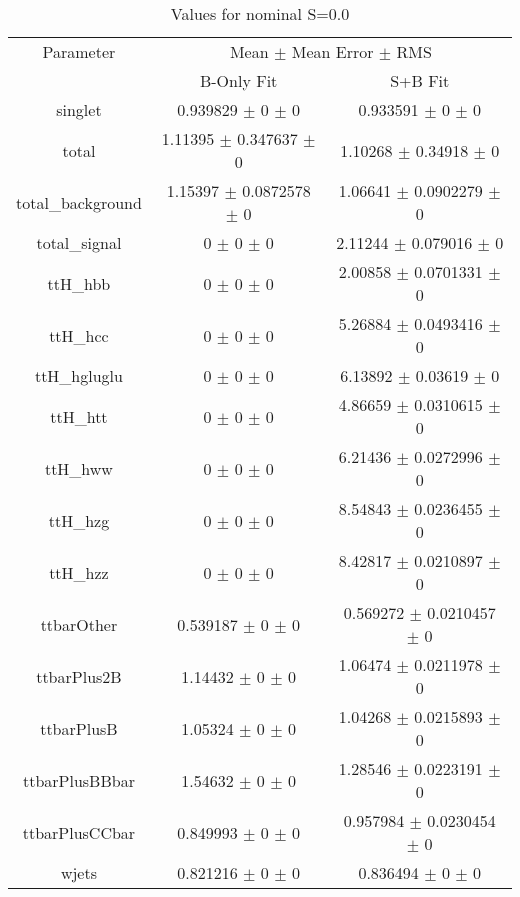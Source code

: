 \begin{table}
\centering
\caption{Values for nominal S=0.0}
\begin{tabular}{ccc}
\toprule
Parameter & \multicolumn{2}{c}{Mean $\pm$ Mean Error $\pm$ RMS}\\
 & B-Only Fit & S+B Fit\\
\midrule
singlet & \num{0.939829} $\pm$ \num{0} $\pm$ \num{0} & \num{0.933591} $\pm$ \num{0} $\pm$ \num{0}\\
total & \num{1.11395} $\pm$ \num{0.347637} $\pm$ \num{0} & \num{1.10268} $\pm$ \num{0.34918} $\pm$ \num{0}\\
total\_background & \num{1.15397} $\pm$ \num{0.0872578} $\pm$ \num{0} & \num{1.06641} $\pm$ \num{0.0902279} $\pm$ \num{0}\\
total\_signal & \num{0} $\pm$ \num{0} $\pm$ \num{0} & \num{2.11244} $\pm$ \num{0.079016} $\pm$ \num{0}\\
ttH\_hbb & \num{0} $\pm$ \num{0} $\pm$ \num{0} & \num{2.00858} $\pm$ \num{0.0701331} $\pm$ \num{0}\\
ttH\_hcc & \num{0} $\pm$ \num{0} $\pm$ \num{0} & \num{5.26884} $\pm$ \num{0.0493416} $\pm$ \num{0}\\
ttH\_hgluglu & \num{0} $\pm$ \num{0} $\pm$ \num{0} & \num{6.13892} $\pm$ \num{0.03619} $\pm$ \num{0}\\
ttH\_htt & \num{0} $\pm$ \num{0} $\pm$ \num{0} & \num{4.86659} $\pm$ \num{0.0310615} $\pm$ \num{0}\\
ttH\_hww & \num{0} $\pm$ \num{0} $\pm$ \num{0} & \num{6.21436} $\pm$ \num{0.0272996} $\pm$ \num{0}\\
ttH\_hzg & \num{0} $\pm$ \num{0} $\pm$ \num{0} & \num{8.54843} $\pm$ \num{0.0236455} $\pm$ \num{0}\\
ttH\_hzz & \num{0} $\pm$ \num{0} $\pm$ \num{0} & \num{8.42817} $\pm$ \num{0.0210897} $\pm$ \num{0}\\
ttbarOther & \num{0.539187} $\pm$ \num{0} $\pm$ \num{0} & \num{0.569272} $\pm$ \num{0.0210457} $\pm$ \num{0}\\
ttbarPlus2B & \num{1.14432} $\pm$ \num{0} $\pm$ \num{0} & \num{1.06474} $\pm$ \num{0.0211978} $\pm$ \num{0}\\
ttbarPlusB & \num{1.05324} $\pm$ \num{0} $\pm$ \num{0} & \num{1.04268} $\pm$ \num{0.0215893} $\pm$ \num{0}\\
ttbarPlusBBbar & \num{1.54632} $\pm$ \num{0} $\pm$ \num{0} & \num{1.28546} $\pm$ \num{0.0223191} $\pm$ \num{0}\\
ttbarPlusCCbar & \num{0.849993} $\pm$ \num{0} $\pm$ \num{0} & \num{0.957984} $\pm$ \num{0.0230454} $\pm$ \num{0}\\
wjets & \num{0.821216} $\pm$ \num{0} $\pm$ \num{0} & \num{0.836494} $\pm$ \num{0} $\pm$ \num{0}\\
\bottomrule
\end{tabular}
\end{table}